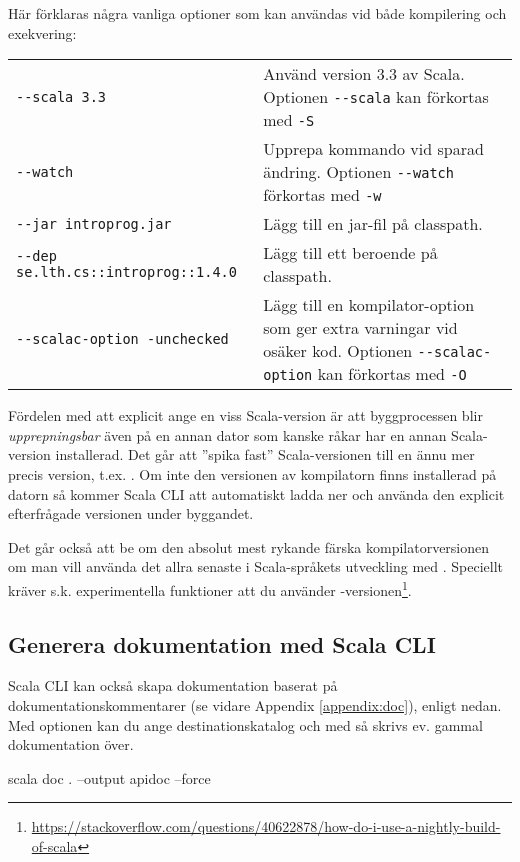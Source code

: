 \noindent Här förklaras några vanliga optioner som kan användas vid både kompilering och exekvering: 
\begin{table}[H]
\begin{tabular}{l p{6.5cm}}
\texttt{-{}-scala 3.3} & Använd version 3.3 av Scala. Optionen \texttt{-{}-scala} kan förkortas med \texttt{-S} \\
\texttt{-{}-watch} & Upprepa kommando vid sparad ändring. Optionen \texttt{-{}-watch} förkortas med \texttt{-w} \\
\texttt{-{}-jar introprog.jar} & Lägg till en jar-fil på classpath. \\
\texttt{-{}-dep se.lth.cs::introprog::1.4.0} & Lägg till ett beroende på classpath. \\
\texttt{-{}-scalac-option -unchecked} & Lägg till en kompilator-option som ger extra varningar vid osäker kod.  Optionen \texttt{-{}-scalac-option} kan förkortas med \texttt{-O}\\
\end{tabular}
\end{table}

\noindent Fördelen med att explicit ange en viss Scala-version är att byggprocessen blir \emph{upprepningsbar} även på en annan dator som kanske råkar har en annan Scala-version installerad. Det går att ''spika fast'' Scala-versionen till en ännu mer precis version, t.ex. . Om inte den versionen av kompilatorn finns installerad på datorn så kommer Scala CLI att automatiskt ladda ner och använda den explicit efterfrågade versionen under byggandet.

Det går också att be om den absolut mest rykande färska kompilatorversionen om man vill använda det allra senaste i Scala-språkets utveckling med . Speciellt kräver s.k. experimentella funktioner att du använder -versionen\footnote{\url{https://stackoverflow.com/questions/40622878/how-do-i-use-a-nightly-build-of-scala}}. 

\subsection{Generera dokumentation med Scala CLI}

Scala CLI kan också skapa dokumentation baserat på dokumentationskommentarer (se vidare Appendix \ref{appendix:doc}), enligt nedan. Med optionen  kan du ange destinationskatalog och med  så skrivs ev. gammal dokumentation över.
\begin{REPLsmall}
scala doc . --output apidoc --force
\end{REPLsmall}

